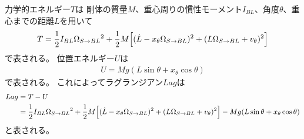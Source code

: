 \documentclass[a4paper,11pt]{jsarticle}
\begin{document}
力学的エネルギー$T$は
剛体の質量$M$、重心周りの慣性モーメント$I_{BL}$、角度$\theta$、重心までの距離$L$を用いて
\begin{align*}
  T = 
  \frac{1}{2}I_{BL}\Omega_{S\rightarrow BL}{}^2
  + \frac{1}{2}M
  \Bigl[ (\dot{L} - x_\theta \Omega_{S\rightarrow BL}{})^2 + (L\Omega_{S\rightarrow BL}{} + v_\theta)^2 \Bigr]
\end{align*}
で表される。
位置エネルギー$U$は
\begin{align*}
  U = Mg ( L\sin\theta + x_\theta \cos\theta )
\end{align*}
で表される。
これによってラグランジアン$Lag$は
\begin{align*}
  Lag &=
  T - U
  \\
  &= 
  \frac{1}{2}I_{BL}\Omega_{S\rightarrow BL}{}^2
  + \frac{1}{2}M
  \Bigl[ (\dot{L} - x_\theta \Omega_{S\rightarrow BL}{})^2 + (L\Omega_{S\rightarrow BL}{} + v_\theta)^2 \Bigr]
  - Mg ( L\sin\theta + x_\theta \cos\theta )
\end{align*}
と表される。
\end{document}
